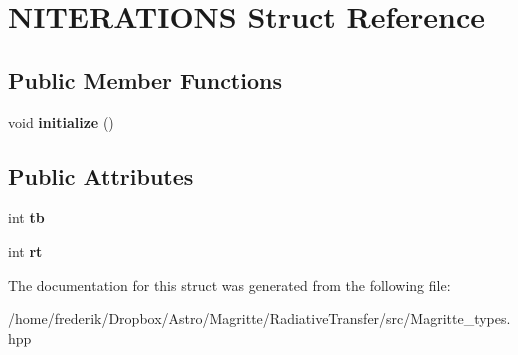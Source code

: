 \hypertarget{structNITERATIONS}{}\section{N\+I\+T\+E\+R\+A\+T\+I\+O\+NS Struct Reference}
\label{structNITERATIONS}
\subsection*{Public Member Functions}
\begin{DoxyCompactItemize}
\item 
\mbox{\label{structNITERATIONS_aa72d789cb476d1726eaaa081a73f8b2a}} 
void {\bfseries initialize} ()
\end{DoxyCompactItemize}
\subsection*{Public Attributes}
\begin{DoxyCompactItemize}
\item 
\mbox{\label{structNITERATIONS_ae3838df392f367d9666a1df9cc0d1e44}} 
int {\bfseries tb}
\item 
\mbox{\label{structNITERATIONS_a8cc9147f65262609f64a538a81819823}} 
int {\bfseries rt}
\end{DoxyCompactItemize}


The documentation for this struct was generated from the following file\+:\begin{DoxyCompactItemize}
\item 
/home/frederik/\+Dropbox/\+Astro/\+Magritte/\+Radiative\+Transfer/src/Magritte\+\_\+types.\+hpp\end{DoxyCompactItemize}
